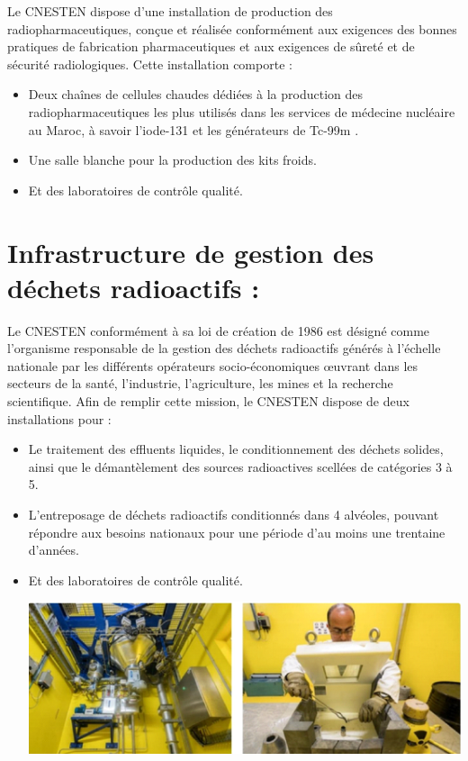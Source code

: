 \documentclass{report}
\newenvironment{mystyle}{
	\setlength{\parindent}{0pt} %
	\setlength{\parskip}{10pt} %
	\fontsize{12pt}{14pt}\selectfont %
}{
}
\begin{document}
	\begin{mystyle}
		Le CNESTEN dispose d’une installation de production des radiopharmaceutiques, conçue et réalisée conformément aux exigences des bonnes pratiques de fabrication pharmaceutiques et aux exigences de sûreté et de sécurité radiologiques. Cette installation comporte :
		\begin{itemize}
			\item Deux chaînes de cellules chaudes dédiées à la production des radiopharmaceutiques les plus utilisés dans les services de médecine nucléaire au Maroc, à savoir l’iode-131 et les générateurs de Tc-99m .
			\item Une salle blanche pour la production des kits froids.
			\item Et des laboratoires de contrôle qualité.
		\end{itemize}
	\end{mystyle}
	
	\section{Infrastructure de gestion des déchets radioactifs :}
	
	\begin{mystyle}
		Le CNESTEN conformément à sa loi de création de 1986 est désigné comme l’organisme responsable de la gestion des déchets radioactifs générés à l’échelle nationale par les différents opérateurs socio-économiques œuvrant dans les secteurs de la santé, l’industrie, l’agriculture, les mines et la recherche scientifique. Afin de remplir cette mission, le CNESTEN dispose de deux installations pour :
		\begin{itemize}
			\item Le traitement des effluents liquides, le conditionnement des déchets solides, ainsi que le démantèlement des sources radioactives scellées de catégories 3 à 5.
			
			\item L’entreposage de déchets radioactifs conditionnés dans 4 alvéoles, pouvant répondre aux besoins nationaux pour une période d’au moins une trentaine d’années.
			\item Et des laboratoires de contrôle qualité.
				\begin{center} %
				\includegraphics[width=1\textwidth]{yellow.png} 
			\end{center}
		\end{itemize}
	\end{mystyle}
	
\end{document}
